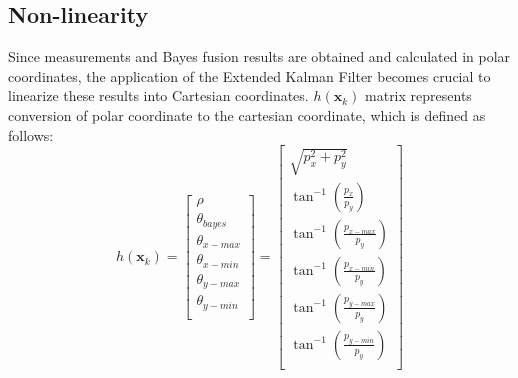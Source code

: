 \newpage
\subsection{Non-linearity}\label{equ:2_non_linear}
Since measurements and Bayes fusion results are obtained and calculated in polar coordinates, 
the application of the Extended Kalman Filter becomes crucial to linearize these results into Cartesian coordinates. 
$h(\mathbf{x}_k)$ matrix represents conversion of polar coordinate to the cartesian coordinate, which is defined as follows:
\begin{equation}
    h(\mathbf{x}_k)=
    \begin{bmatrix}
        \rho \\ 
        \theta_{bayes}\\
        \theta_{x-max} \\
        \theta_{x-min} \\
        \theta_{y-max} \\
        \theta_{y-min} \\
    \end{bmatrix}=
    \begin{bmatrix}
    \sqrt{p_x^2+p_y^2}\\
    \tan^{-1}(\frac{p_x}{p_y})\\
    \tan^{-1}(\frac{p_{x-max}}{p_y})\\
    \tan^{-1}(\frac{p_{x-min}}{p_y})\\
    \tan^{-1}(\frac{p_{y-max}}{p_y})\\
    \tan^{-1}(\frac{p_{y-min}}{p_y})\\
    \end{bmatrix}
\end{equation}

